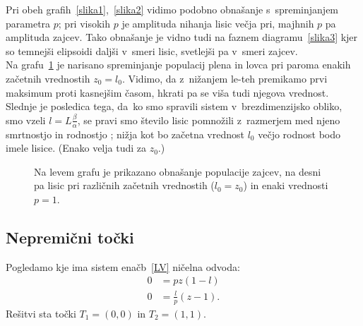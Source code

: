 \documentclass[a4paper,pdftex,10pt]{article}
\numberwithin{equation}{section} %
\numberwithin{figure}{section} %
\numberwithin{table}{section} %
\begin{document}
Pri obeh grafih~\ref{slika1},~\ref{slika2} vidimo podobno obnašanje s~spreminjanjem 
parametra $p$;
pri visokih $p$ je amplituda nihanja lisic večja pri, majhnih $p$ pa amplituda zajcev.
Tako obnašanje je vidno tudi na faznem diagramu~\ref{slika3} kjer so temnejši elipsoidi 
daljši v~smeri lisic, svetlejši pa v~smeri zajcev.\\
Na grafu~\ref{slika5} je narisano spreminjanje populacij plena in lovca pri paroma enakih
začetnih vrednostih $z_0=l_0$. Vidimo, da z~nižanjem le-teh premikamo prvi maksimum proti
kasnejšim časom, hkrati pa se viša tudi njegova vrednost. Slednje je posledica tega, da~ko
smo spravili sistem v~brezdimenzijsko obliko, smo vzeli $l = L \frac{\beta}{\alpha}$,
se pravi smo število lisic pomnožili z~razmerjem med njeno smrtnostjo in rodnostjo ; nižja
kot bo začetna vrednost $l_0$ večjo rodnost bodo imele lisice. (Enako velja tudi za 
$z_0$.)

\begin{figure}    
    \centering
    \resizebox{0.8\linewidth}{!}{}
    \caption{Na levem grafu je prikazano obnašanje populacije zajcev, na desni pa lisic
    pri različnih začetnih vrednostih ($l_0=z_0$) in enaki vrednosti $p=1$.}
    \label{slika5}
\end{figure}

\subsection{Nepremični točki}
Pogledamo kje ima sistem enačb~\ref{LV} ničelna odvoda:
\begin{align*}
    0 &= p z (1-l) \\
    0 &= \frac{l}{p} (z-1).
\end{align*}
Rešitvi sta točki $T_1=(0,0)$ in $T_2=(1,1)$. 
\end{document}
